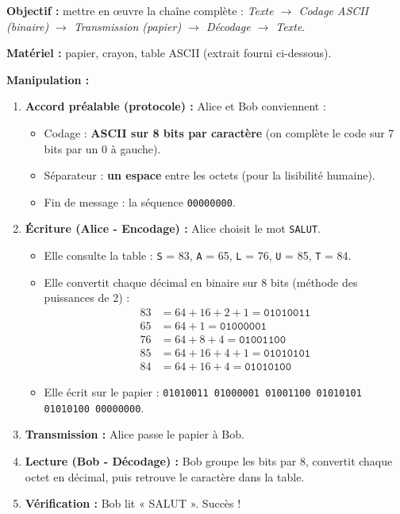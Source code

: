 \documentclass[11pt]{article}
\begin{document}
\begin{experience}
\textbf{Objectif :} mettre en œuvre la chaîne complète : \emph{Texte $\to$ Codage ASCII (binaire) $\to$ Transmission (papier) $\to$ Décodage $\to$ Texte}.

\textbf{Matériel :} papier, crayon, table ASCII (extrait fourni ci-dessous).

\textbf{Manipulation :}
\begin{enumerate}
    \item \textbf{Accord préalable (protocole) :} Alice et Bob conviennent :
        \begin{itemize}
            \item Codage : \textbf{ASCII sur 8 bits par caractère} (on complète le code sur 7 bits par un 0 à gauche).
            \item Séparateur : \textbf{un espace} entre les octets (pour la lisibilité humaine).
            \item Fin de message : la séquence \texttt{00000000}.
        \end{itemize}
    \item \textbf{Écriture (Alice - Encodage) :} Alice choisit le mot \texttt{SALUT}.
        \begin{itemize}
            \item Elle consulte la table : \texttt{S} = 83, \texttt{A} = 65, \texttt{L} = 76, \texttt{U} = 85, \texttt{T} = 84.
            \item Elle convertit chaque décimal en binaire sur 8 bits (méthode des puissances de 2) :
            \begin{align*}
                83 &= 64+16+2+1 = \texttt{01010011} \\
                65 &= 64+1 = \texttt{01000001} \\
                76 &= 64+8+4 = \texttt{01001100} \\
                85 &= 64+16+4+1 = \texttt{01010101} \\
                84 &= 64+16+4 = \texttt{01010100}
            \end{align*}
            \item Elle écrit sur le papier : \texttt{01010011 01000001 01001100 01010101 01010100 00000000}.
        \end{itemize}
    \item \textbf{Transmission :} Alice passe le papier à Bob.
    \item \textbf{Lecture (Bob - Décodage) :} Bob groupe les bits par 8, convertit chaque octet en décimal, puis retrouve le caractère dans la table.
    \item \textbf{Vérification :} Bob lit « SALUT ». Succès !
\end{enumerate}


\end{experience}
\end{document}
